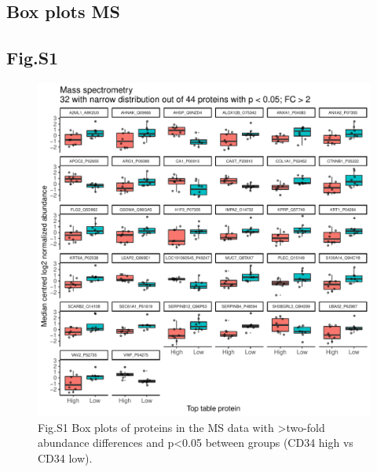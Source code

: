 \documentclass[
]{article}
\begin{document}
\hypertarget{box-plots-ms}{%
\subsection{Box plots MS}\label{box-plots-ms}}

\hypertarget{fig.s1}{%
\subsection{Fig.S1}\label{fig.s1}}

\begin{figure}
\centering
\includegraphics[width=1\textwidth,height=\textheight]{../out_r/008_boxplot_p005_FC_2_sign_DEqMS_narrow_dist_eq_med_norm.pdf}
\caption{Fig.S1 Box plots of proteins in the MS data with
\textgreater two-fold abundance differences and p\textless0.05 between
groups (CD34 high vs CD34 low).}
\end{figure}
\end{document}
